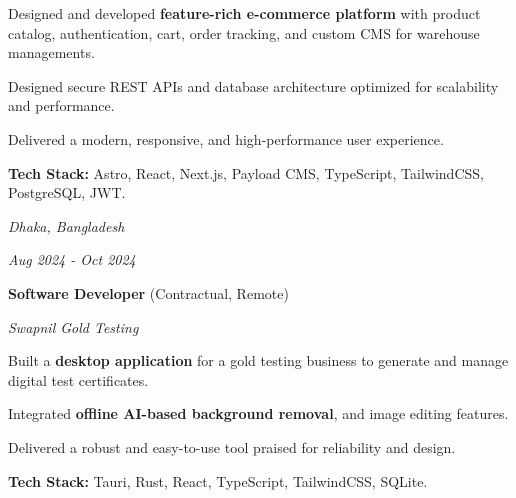     \vspace{0.10 cm}
    \begin{onecolentry}
        \begin{highlights}
            \item Designed and developed \textbf{feature-rich e-commerce platform} with product catalog, authentication, cart, order tracking, and custom CMS for warehouse managements.
            \item Designed secure REST APIs and database architecture optimized for scalability and performance.
            \item Delivered a modern, responsive, and high-performance user experience.
            \item  \textbf{Tech Stack:} Astro, React, Next.js, Payload CMS, TypeScript, TailwindCSS, PostgreSQL, JWT.
        \end{highlights}
    \end{onecolentry}


    \newpage

    \begin{twocolentry}{
    \textit{Dhaka, Bangladesh}

    \textit{Aug 2024 - Oct 2024}}
        \textbf{Software Developer} (Contractual, Remote)
        
        \textit{Swapnil Gold Testing}
    \end{twocolentry}

    \vspace{0.10 cm}
    \begin{onecolentry}
        \begin{highlights}
            \item Built a \textbf{desktop application} for a gold testing business to generate and manage digital test certificates.
            \item Integrated \textbf{offline AI-based background removal}, and image editing features.
            \item Delivered a robust and easy-to-use tool praised for reliability and design.
            \item  \textbf{Tech Stack:} Tauri, Rust, React, TypeScript, TailwindCSS, SQLite.
        \end{highlights}
    \end{onecolentry}

